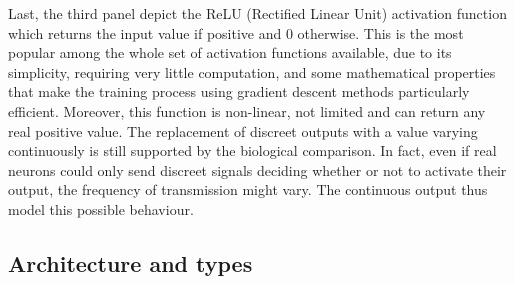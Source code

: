 \documentclass[a4paper,10pt]{report}
\begin{document}
Last, the third panel depict the ReLU (Rectified Linear Unit) activation function which returns the input value if 
positive and 0 otherwise. This is the most popular among the whole set of activation functions available, due to its simplicity, requiring very little computation, and some mathematical properties that make the training process using gradient
descent methods particularly efficient.
Moreover, this function is non-linear, not limited and can return any real positive value.
The replacement of discreet outputs with a value varying continuously is still supported by the biological comparison.
In fact, even if real neurons could only send discreet signals deciding whether or not to activate their output, 
the frequency of transmission might vary. The continuous output thus model this possible behaviour.

\subsection{Architecture and types}
\end{document}
